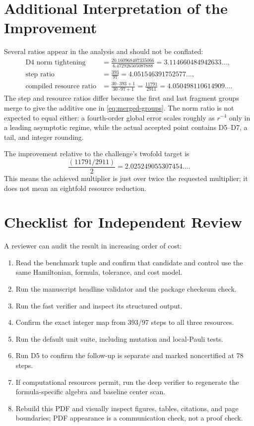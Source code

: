 \section{Additional Interpretation of the Improvement}
\label{app:interpretation}

Several ratios appear in the analysis and should not be conflated:
\begin{align}
\text{D4 norm tightening}
  &=\frac{20.160968407335066}{6.472926505087888}
    =3.114660484942633\ldots,\\
\text{step ratio}
  &=\frac{393}{97}=4.051546391752577\ldots,\\
\text{compiled resource ratio}
  &=\frac{30\cdot393+1}{30\cdot97+1}
    =\frac{11791}{2911}
    =4.050498110614909\ldots.
\end{align}
The step and resource ratios differ because the first and last fragment groups
merge to give the additive one in \cref{eq:merged-groups}.  The norm ratio is
not expected to equal either: a fourth-order global error scales roughly as
$r^{-4}$ only in a leading asymptotic regime, while the actual accepted point
contains D5--D7, a tail, and integer rounding.

The improvement relative to the challenge's twofold target is
\begin{equation}
 \frac{(11791/2911)}{2}=2.025249055307454\ldots.
\end{equation}
This means the achieved multiplier is just over twice the requested
multiplier; it does not mean an eightfold resource reduction.

\section{Checklist for Independent Review}
\label{app:checklist}

A reviewer can audit the result in increasing order of cost:
\begin{enumerate}
\item Read the benchmark tuple and confirm that candidate and control use the
same Hamiltonian, formula, tolerance, and cost model.
\item Run the manuscript headline validator and the package checksum check.
\item Run the fast verifier and inspect its structured output.
\item Confirm the exact integer map from 393/97 steps to all three resources.
\item Run the default unit suite, including mutation and local-Pauli tests.
\item Run D5  to confirm the follow-up is separate and
marked noncertified at 78 steps.
\item If computational resources permit, run the deep verifier to regenerate
the formula-specific algebra and baseline center scan.
\item Rebuild this PDF and visually inspect figures, tables, citations, and
page boundaries; PDF appearance is a communication check, not a proof check.
\end{enumerate}

